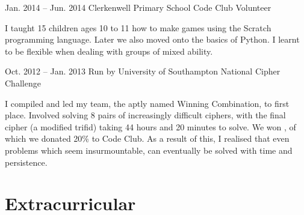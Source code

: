 \documentclass{tccv}
\begin{document}
\begin{eventlist}
        \item{Jan. 2014 -- Jun. 2014}
             {Clerkenwell Primary School}
             {Code Club Volunteer}

        I taught 15 children ages 10 to 11 how to make games using the Scratch programming language. Later we also moved onto the basics of Python. I learnt to be flexible when dealing with groups of mixed ability.

        \item{Oct. 2012 -- Jan. 2013}
             {Run by University of Southampton}
             {National Cipher Challenge}

        I compiled and led my team, the aptly named Winning Combination, to first place. Involved solving 8 pairs of increasingly difficult ciphers, with the final cipher (a modified trifid) taking 44 hours and 20 minutes to solve. We won , of which we donated 20\% to Code Club. As a result of this, I realised that even problems which seem insurmountable, can eventually be solved with time and persistence.

    \end{eventlist}


\vfill

\section{Extracurricular}
\end{document}
